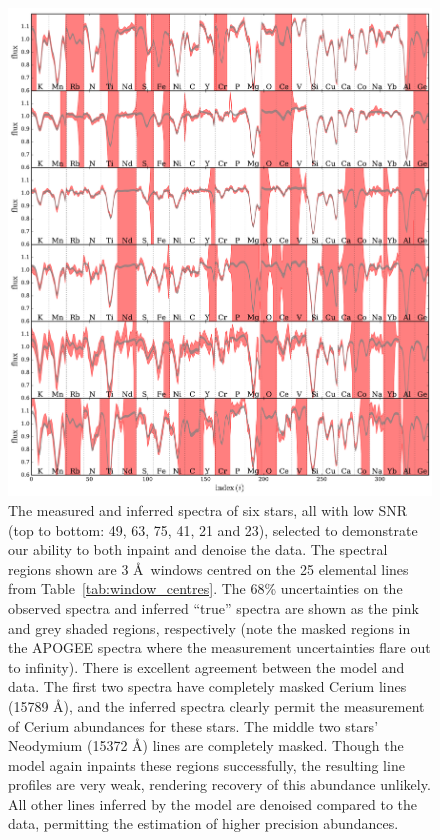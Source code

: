 \documentclass[a4paper,fleqn,usenatbib]{mnras}
\begin{document}
\begin{figure}
	\includegraphics[width=2\columnwidth]{apogee_centers_final_29502_spc_win_wid_1p5_save_spectra.pdf}
    \caption{The measured and inferred spectra of six stars, all with low SNR (top to bottom: 49, 63, 75, 41, 21 and 23), selected to demonstrate our ability to both inpaint and denoise the data. The spectral regions shown are 3 \AA\ windows centred on the 25 elemental lines from Table~\ref{tab:window_centres}. The 68\% uncertainties on the observed spectra and inferred ``true'' spectra are shown as the pink and grey shaded regions, respectively (note the masked regions in the APOGEE spectra where the measurement uncertainties flare out to infinity). There is excellent agreement between the model and data. The first two spectra have completely masked Cerium lines (15789 \AA), and the inferred spectra clearly permit the measurement of Cerium abundances for these stars. The middle two stars' Neodymium (15372 \AA) lines are completely masked. Though the model again inpaints these regions successfully, the resulting line profiles are very weak, rendering recovery of this abundance unlikely. All other lines inferred by the model are denoised compared to the data, permitting the estimation of higher precision abundances.}
    \label{fig:inpainting_denoising_examples}
\end{figure}
\end{document}
